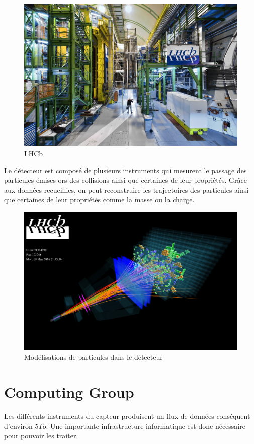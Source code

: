 \documentclass[a4paper]{report}
\begin{document}
\begin{figure}[H]
    \includegraphics[width=\textwidth, center]{LHCb.jpg}
    \caption{LHCb}
    \label{LHCb}
\end{figure}

Le détecteur est composé de plusieurs instruments qui mesurent le passage des particules émises ors des collisions ainsi que certaines de leur propriétés.
Grâce aux données recueillies, on peut reconstruire les trajectoires des particules ainsi que certaines de leur propriétés comme la masse ou la charge.

\begin{figure}[!htb]
    \includegraphics[width=\textwidth, center]{LHCb_3D.png}
    \caption{Modélisations de particules dans le détecteur}
    \label{LHCb_3D}
\end{figure}

\section{Computing Group}
Les différents instruments du capteur produisent un flux de données conséquent d'environ $5 To$.
Une importante infrastructure informatique est donc nécessaire pour pouvoir les traiter.
\end{document}
